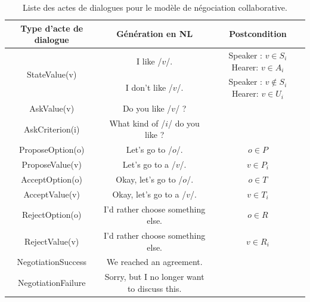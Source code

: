 \begin{table}[p]
	\begin{adjustbox}{angle=90}
		\begin{tabular} {|c|c|c|}
			\hline
			\textbf{Type d'acte de dialogue}  &\textbf{ Génération en NL} & \textbf{Postcondition}\\
			\hline
			\multirow{2}{*}{StateValue(v)} &  I like /$v$/. & Speaker : $v \in S_i$ \newline Hearer:  \newline $v\in A_i$ \\
			
			\cline{2-3} & I don't like /$v$/. & Speaker : $v \notin S_i$ \newline Hearer:  $v\in U_i$ \\
			
			\hline
			AskValue(v)& Do you like /$v$/ ? & \multirow{2}{*}{} \\
			
			AskCriterion(i) &  What kind of /$i$/ do you like ? & \\
			\hline
			ProposeOption(o)  & Let's go to /$o$/. & $o \in P$\\
			
			ProposeValue(v) & Let's go to a /$v$/. & $v \in P_i$\\
			\hline
			AcceptOption(o)& Okay, let's go to /$o$/.& $o \in T$ \\
			
			AcceptValue(v) & Okay, let's go to a /$v$/.& $v \in T_i$ \\
			\hline
			RejectOption(o) & I'd rather choose  something else. & $o \in R$\\
			
			RejectValue(v) &  I'd rather choose  something else. & $v \in R_i$ \\
			\hline
			NegotiationSuccess &  We reached an agreement. & \multirow{2}{*}{}\\
			\cline{1-2}
			NegotiationFailure &  Sorry, but I no longer want to discuss this. & \\
			\hline
		\end{tabular}
		
		\caption{\label{table:utt}Liste des actes de dialogues pour le modèle de négociation collaborative.}
	\end{adjustbox}
\end{table}


